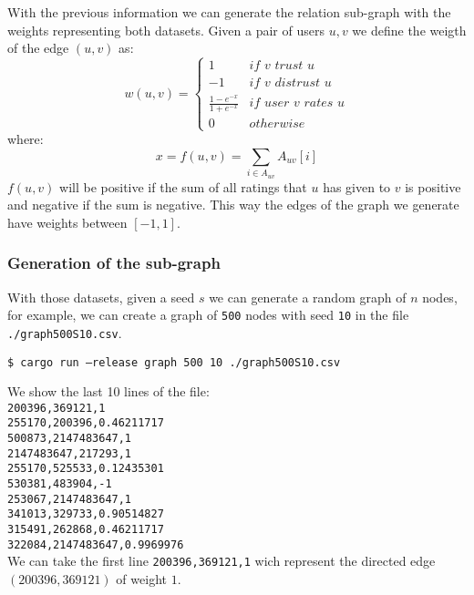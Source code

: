 \documentclass[letter,10pt]{article}
\theoremstyle{definition}
\begin{document}
 With the previous information we can generate the relation sub-graph with the weights representing both datasets. Given a pair of users $u,v$ we define the weigth of the edge $(u,v)$ as:
 \[
    w(u,v) = 
    \begin{cases}
       1 &  \textit{if $v$ trust $u$} \\
       -1 &  \textit{if $v$ distrust $u$} \\
       \frac{1-e^{-x}}{1+e^{-x}} & \textit{if user v rates u} \\
       0 & otherwise 
     \end{cases}
 \]
where:
\[
    x = f(u,v) = \sum_{i\in A_{uv}} A_{uv}[i]
\]
$f(u,v)$ will be positive if the sum of all ratings that $u$ has given to $v$ is positive and negative if the sum is negative. This way the edges of the graph we generate have weights between $[-1,1]$. 
\subsubsection{Generation of the sub-graph}

With those datasets, given a seed $s$ we can generate a random graph of $n$ nodes, for example, we can create a graph of \texttt{500} nodes with seed \texttt{10} in the file \texttt{./graph500S10.csv}.

\begin{center}
    \texttt{\$ cargo run --release graph 500 10 ./graph500S10.csv  }
\end{center}

We show the last 10 lines of the file:\\
    \texttt{200396,369121,1}\\
    \texttt{255170,200396,0.46211717}\\
    \texttt{500873,2147483647,1}\\
    \texttt{2147483647,217293,1}\\
    \texttt{255170,525533,0.12435301}\\
    \texttt{530381,483904,-1}\\
    \texttt{253067,2147483647,1}\\
    \texttt{341013,329733,0.90514827}\\
    \texttt{315491,262868,0.46211717}\\
    \texttt{322084,2147483647,0.9969976}\\

We can take the first line \texttt{200396,369121,1} wich represent the directed edge $(200396,369121)$ of weight $1$.
\end{document}
